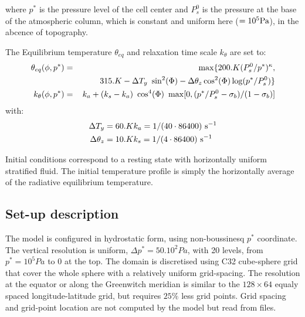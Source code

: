 where $p^*$ is the pressure level of the cell center 
and $P^{0}_{s}$ is the pressure at the base of the atmospheric column,
which is constant and uniform here ($= 10^5 {\rm Pa}$), in the abcence 
of topography.

The Equilibrium temperature $\theta_{eq}$ and relaxation time scale $k_{\theta}$ 
are set to:
\begin{eqnarray}
\label{EQ:eg-hs-define_Teq}
\theta_{eq}(\phi,p^*) & = & \max \{ 200.K (P^{0}_{s}/p^*)^\kappa,\\
\nonumber
& & \hspace{8mm} 315.K - \Delta T_y~\sin^2(\Phi) 
  - \Delta \theta_z \cos^2(\Phi) \log(p^*/P^{0}_s) \}
\\
\label{EQ:eg-hs-define_kT}
k_{\theta}(\phi,p^*) & = &
k_a + (k_s -k_a)~\cos^4(\Phi)~\max[0,(p^*/P^{0}_{s}-\sigma_{b})/(1-\sigma_{b})]
\end{eqnarray}
with:
\begin{eqnarray*}
 \Delta T_y = 60.K & k_a = 1/(40 \cdot 86400) ~{\rm s}^{-1}\\
\Delta \theta_z = 10.K & k_s = 1/(4 \cdot 86400) ~{\rm s}^{-1}
\end{eqnarray*}

Initial conditions correspond to a resting state with horizontally uniform 
stratified fluid. The initial temperature profile is simply the 
horizontally average of the radiative equilibrium temperature.

\subsection{Set-up description}
\label{www:tutorials}

The model is configured in hydrostatic form, using non-boussinesq
$p^*$ coordinate.
The vertical resolution is uniform, $\Delta p^* = 50.10^2 Pa$,
with 20 levels, from $p^*=10^5 Pa$ to $0$ at the top.
The domain is discretised using C32 cube-sphere grid \cite[]{adcroft:04b}
that cover the whole sphere with a relatively uniform grid-spacing.
The resolution at the equator or along the Greenwitch meridian
is similar to the $128 \times 64$ equaly spaced longitude-latitude grid,
but requires $25\%$ less grid points.
Grid spacing and grid-point location are not computed by the model but
read from files.

